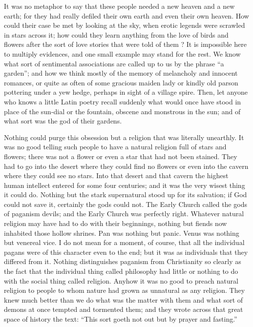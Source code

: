 \documentclass{book}
\begin{document}
It was no metaphor to say that these people needed a new heaven and a new earth; for they had really defiled their own earth and even their own heaven. How could their case be met by looking at the sky, when erotic legends were scrawled in stars across it; how could they learn anything from the love of birds and flowers after the sort of love stories that were told of them ? It is impossible here to multiply evidences, and one small example may stand for the rest. We know what sort of sentimental associations are called up to us by the phrase “a garden”; and how we think mostly of the memory of melancholy and innocent romances, or quite as often of some gracious maiden lady or kindly old parson pottering under a yew hedge, perhaps in sight of a village spire. Then, let anyone who knows a little Latin poetry recall suddenly what would once have stood in place of the sun-dial or the fountain, obscene and monstrous in the sun; and of what sort was the god of their gardens.

Nothing could purge this obsession but a religion that was literally unearthly. It was no good telling such people to have a natural religion full of stars and flowers; there was not a flower or even a star that had not been stained. They had to go into the desert where they could find no flowers or even into the cavern where they could see no stars. Into that desert and that cavern the highest human intellect entered for some four centuries; and it was the very wisest thing it could do. Nothing but the stark supernatural stood up for its salvation; if God could not save it, certainly the gods could not. The Early Church called the gods of paganism devils; and the Early Church was perfectly right. Whatever natural religion may have had to do with their beginnings, nothing but fiends now inhabited those hollow shrines. Pan was nothing but panic. Venus was nothing but venereal vice. I do not mean for a moment, of course, that all the individual pagans were of this character even to the end; but it was as individuals that they differed from it. Nothing distinguishes paganism from Christianity so clearly as the fact that the individual thing called philosophy had little or nothing to do with the social thing called religion. Anyhow it was no good to preach natural religion to people to whom nature had grown as unnatural as any religion. They knew much better than we do what was the matter with them and what sort of demons at once tempted and tormented them; and they wrote across that great space of history the text: “This sort goeth not out but by prayer and fasting.”
\end{document}
